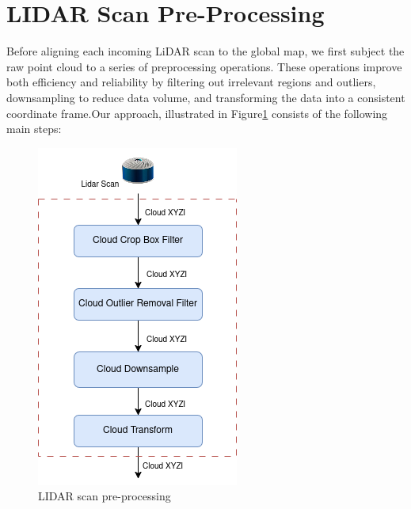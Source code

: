 \section{LIDAR Scan Pre-Processing}
Before aligning each incoming LiDAR scan to the global map, we first subject the raw point cloud to a series of preprocessing operations. These operations improve both efficiency and reliability by filtering out irrelevant regions and outliers, downsampling to reduce data volume, and transforming the data into a consistent coordinate frame.Our approach, illustrated in Figure\ref{fig:lidar_scan_preprocessing}  consists of the following  main steps:
\begin{figure}
    \centering
    \includegraphics[width=0.4\linewidth]{images/LIDAR_PreProccess.drawio.png}
    \caption{LIDAR scan pre-processing}
    \label{fig:lidar_scan_preprocessing}
\end{figure}

